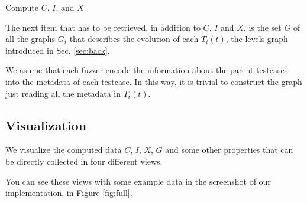 \documentclass[conference,compsoc]{IEEEtran}
\begin{document}
\begin{algorithm}[h]
\DontPrintSemicolon


 \;
 \caption{Compute $C$, $I$, and $X$}
 \label{alg:data}
\end{algorithm}

The next item that has to be retrieved, in addition to $C$, $I$ and $X$, is the set $G$ of all the graphs $G_i$ that describes the evolution of each $T_i(t)$, the levels graph introduced in Sec. \ref{sec:back}.

We asume that each fuzzer encode the information about the parent testcases into the metadata of each testcase. In this way, it is trivial to construct the graph just reading all the metadata in $T_i(t)$.

\subsection{Visualization}

We visualize the computed data $C$, $I$, $X$, $G$ and some other properties that can be directly collected in four different views.

You can see these views with some example data in the screenshot of our implementation, in Figure \ref{fig:full}.
\end{document}
